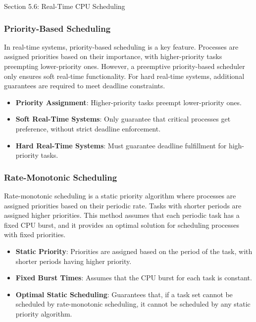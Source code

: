 \begin{notes}{Section 5.6: Real-Time CPU Scheduling}
\begin{highlight}
    \end{highlight}
    
    \subsubsection*{Priority-Based Scheduling}
    
    In real-time systems, priority-based scheduling is a key feature. Processes are assigned priorities based on their importance, with higher-priority tasks preempting lower-priority ones. However, a 
    preemptive priority-based scheduler only ensures soft real-time functionality. For hard real-time systems, additional guarantees are required to meet deadline constraints.
    
    \begin{highlight}
    
        \begin{itemize}
            \item \textbf{Priority Assignment}: Higher-priority tasks preempt lower-priority ones.
            \item \textbf{Soft Real-Time Systems}: Only guarantee that critical processes get preference, without strict deadline enforcement.
            \item \textbf{Hard Real-Time Systems}: Must guarantee deadline fulfillment for high-priority tasks.
        \end{itemize}
    
    \end{highlight}
    
    \subsubsection*{Rate-Monotonic Scheduling}
    
    Rate-monotonic scheduling is a static priority algorithm where processes are assigned priorities based on their periodic rate. Tasks with shorter periods are assigned higher priorities. This method 
    assumes that each periodic task has a fixed CPU burst, and it provides an optimal solution for scheduling processes with fixed priorities.
    
    \begin{highlight}
    
        \begin{itemize}
            \item \textbf{Static Priority}: Priorities are assigned based on the period of the task, with shorter periods having higher priority.
            \item \textbf{Fixed Burst Times}: Assumes that the CPU burst for each task is constant.
            \item \textbf{Optimal Static Scheduling}: Guarantees that, if a task set cannot be scheduled by rate-monotonic scheduling, it cannot be scheduled by any static priority algorithm.
        \end{itemize}
    

\end{highlight}
\end{notes}
